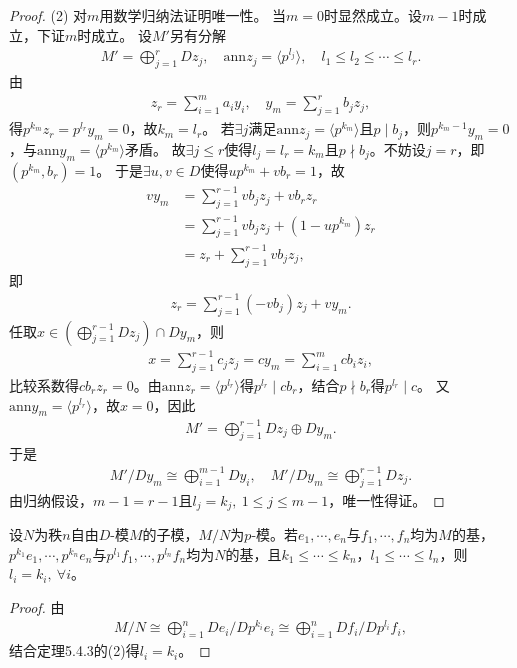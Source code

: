 \documentclass[../../main.tex]{subfiles}%
\begin{document}
\begin{proof}
(2) 对$m$用数学归纳法证明唯一性。
当$m=0$时显然成立。设$m-1$时成立，下证$m$时成立。
设$M'$另有分解
\begin{align*}
M'=\bigoplus\limits_{j=1}^{r}Dz_j,\quad \mathrm{ann}z_j=\langle p^{l_j}\rangle,\quad l_1\leqslant l_2\leqslant\cdots\leqslant l_r.
\end{align*}
由
\begin{align*}
z_r=\sum\limits_{i=1}^{m}a_iy_i,\quad y_m=\sum\limits_{j=1}^{r}b_jz_j,
\end{align*}
得$p^{k_m}z_r=p^{l_r}y_m=0$，故$k_m=l_r$。
若$\exists j$满足$\mathrm{ann}z_j=\langle p^{k_m}\rangle$且$p\mid b_j$，则$p^{k_m-1}y_m=0$，与$\mathrm{ann}y_m=\langle p^{k_m}\rangle$矛盾。
故$\exists j\leqslant r$使得$l_j=l_r=k_m$且$p\nmid b_j$。不妨设$j=r$，即$(p^{k_m},b_r)=1$。
于是$\exists u,v\in D$使得$up^{k_m}+vb_r=1$，故
\begin{align*}
vy_m&=\sum\limits_{j=1}^{r-1}vb_jz_j+vb_rz_r\\
&=\sum\limits_{j=1}^{r-1}vb_jz_j+(1-up^{k_m})z_r\\
&=z_r+\sum\limits_{j=1}^{r-1}vb_jz_j,
\end{align*}
即
\begin{align*}
z_r=\sum\limits_{j=1}^{r-1}(-vb_j)z_j+vy_m.
\end{align*}
任取$x\in\left(\bigoplus\limits_{j=1}^{r-1}Dz_j\right)\cap Dy_m$，则
\begin{align*}
x=\sum\limits_{j=1}^{r-1}c_jz_j=cy_m=\sum\limits_{i=1}^{m}cb_iz_i,
\end{align*}
比较系数得$cb_rz_r=0$。由$\mathrm{ann}z_r=\langle p^{l_r}\rangle$得$p^{l_r}\mid cb_r$，结合$p\nmid b_r$得$p^{l_r}\mid c$。
又$\mathrm{ann}y_m=\langle p^{l_r}\rangle$，故$x=0$，因此
\begin{align*}
M'=\bigoplus\limits_{j=1}^{r-1}Dz_j\oplus Dy_m.
\end{align*}
于是
\begin{align*}
M'/Dy_m\cong\bigoplus\limits_{i=1}^{m-1}Dy_i,\quad M'/Dy_m\cong\bigoplus\limits_{j=1}^{r-1}Dz_j.
\end{align*}
由归纳假设，$m-1=r-1$且$l_j=k_j,\ 1\leqslant j\leqslant m-1$，唯一性得证。

\end{proof}

\begin{corollary}
设$N$为秩$n$自由$D$-模$M$的子模，$M/N$为$p$-模。若$e_1,\cdots,e_n$与$f_1,\cdots,f_n$均为$M$的基，$p^{k_1}e_1,\cdots,p^{k_n}e_n$与$p^{l_1}f_1,\cdots,p^{l_n}f_n$均为$N$的基，且$k_1\leqslant\cdots\leqslant k_n$，$l_1\leqslant\cdots\leqslant l_n$，则$l_i=k_i,\ \forall i$。
\end{corollary}
\begin{proof}

由
\begin{align*}
M/N\cong\bigoplus\limits_{i=1}^{n}De_i/Dp^{k_i}e_i\cong\bigoplus\limits_{i=1}^{n}Df_i/Dp^{l_i}f_i,
\end{align*}
结合定理5.4.3的(2)得$l_i=k_i$。

\end{proof}
\end{document}
